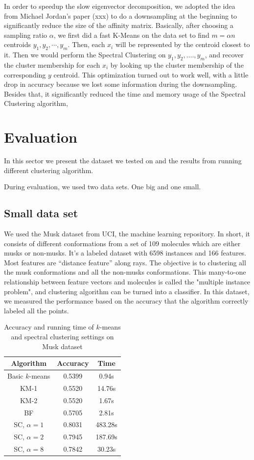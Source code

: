 \documentclass{acm_proc_article-sp}
\begin{document}
In order to speedup the slow eigenvector decomposition, we adopted the idea from Michael Jordan’s paper (xxx) to do a downsampling at the beginning to significantly reduce the size of the affinity matrix. Basically, after choosing a sampling ratio $\alpha$, we first did a fast K-Means on the data set to find $m = \alpha n$ centroids $y_1, y_2, \cdots, y_m$. Then, each $x_i$ will be represented by the centroid closest to it. Then we would perform the Spectral Clustering on $y_1, y_2, …., y_m$, and recover the cluster membership for each $x_i$ by looking up the cluster membership of the corresponding $y$ centroid. This optimization turned out to work well, with a little drop in accuracy because we lost some information during the downsampling. Besides that, it significantly reduced the time and memory usage of the Spectral Clustering algorithm,


\section{Evaluation}


In this sector we present the dataset we tested on and the results from running different clustering algorithm.

During evaluation, we used two data sets. One big and one small.
\\

\subsection{Small data set}
We used the Musk dataset from UCI, the machine learning repository. In short, it consists of different conformations from a set of 109 molecules which are either musks or non-musks. It’s a labeled dataset with 6598 instances and 166 features. Most features are “distance feature” along rays.
The objective is to clustering all the musk conformations and all the non-musks conformations. This many-to-one relationship between feature vectors and molecules is called the "multiple instance problem", and clustering algorithm can be turned into a classifier. In this dataset, we measured the performance based on the accuracy that the algorithm correctly labeled all the points.
\\

\begin{table}
\centering
\begin{tabular}{|c|cc|}
\hline
Algorithm & Accuracy & Time \\
\hline
 Basic $k$-means & 0.5399 & 0.94s\\
 KM-1 & 0.5520 & 14.76s\\
 KM-2 & 0.5520 & 1.67s\\
 BF & 0.5705 & 2.81s\\
 SC, $\alpha=1$ & 0.8031 & 483.28s\\
 SC, $\alpha=2$ & 0.7945 & 187.69s\\
 SC, $\alpha=8$ & 0.7842 & 30.23s\\
 \hline
\end{tabular}
\caption{Accuracy and running time of $k$-means and spectral clustering settings on Musk dataset}
\label{table_musk}
\end{table}
\end{document}
